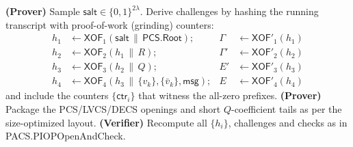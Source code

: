 \begin{algorithm}[H]
\caption{\textsf{PACS.ToNIZK} \ (\emph{Fiat--Shamir wrapper with grinding})}
\begin{algorithmic}[1]
\State \textbf{(Prover)} Sample \(\textsf{salt}\in\{0,1\}^{2\lambda}\).
\State Derive challenges by hashing the running transcript with proof-of-work (grinding) counters:
\[
\begin{aligned}
h_1&\leftarrow \textsf{XOF}_1(\textsf{salt}\,\|\,\textsf{PCS.Root}); & \Gamma &\leftarrow \textsf{XOF}'_1(h_1)\\
h_2&\leftarrow \textsf{XOF}_2(h_1\,\|\,R); & \Gamma' &\leftarrow \textsf{XOF}'_2(h_2)\\
h_3&\leftarrow \textsf{XOF}_3(h_2\,\|\,Q); & E' &\leftarrow \textsf{XOF}'_3(h_3)\\
h_4&\leftarrow \textsf{XOF}_4(h_3\,\|\,\{v_k\},\{ \bar v_k\},\textsf{msg}); & E &\leftarrow \textsf{XOF}'_4(h_4)
\end{aligned}
\]
and include the counters \(\{\textsf{ctr}_i\}\) that witness the all-zero prefixes.
\State \textbf{(Prover)} Package the PCS/LVCS/DECS openings and short \(Q\)-coefficient tails as per the size-optimized layout.
\State \textbf{(Verifier)} Recompute all \(\{h_i\}\), challenges and checks as in \textsf{PACS.PIOPOpenAndCheck}.
\end{algorithmic}
\end{algorithm}

